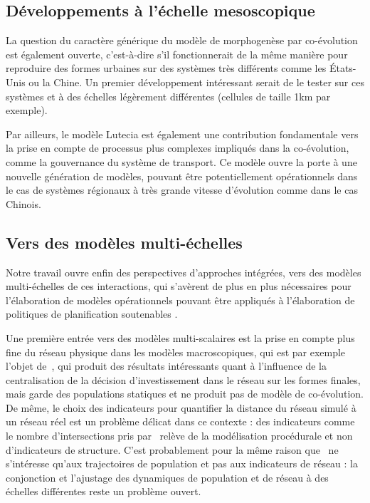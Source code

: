 \documentclass[11pt]{article}
\begin{document}
\subsection{Développements à l'échelle mesoscopique}

La question du caractère générique du modèle de morphogenèse par co-évolution est également ouverte, c'est-à-dire s'il fonctionnerait de la même manière pour reproduire des formes urbaines sur des systèmes très différents comme les États-Unis ou la Chine. Un premier développement intéressant serait de le tester sur ces systèmes et à des échelles légèrement différentes (cellules de taille 1km par exemple).

Par ailleurs, le modèle Lutecia est également une contribution fondamentale vers la prise en compte de processus plus complexes impliqués dans la co-évolution, comme la gouvernance du système de transport.
 Ce modèle ouvre la porte à une nouvelle génération de modèles, pouvant être potentiellement opérationnels dans le cas de systèmes régionaux à très grande vitesse d'évolution comme dans le cas Chinois.


\subsection{Vers des modèles multi-échelles}


Notre travail ouvre enfin des perspectives d'approches intégrées, vers des modèles multi-échelles de ces interactions, qui s'avèrent de plus en plus nécessaires pour l'élaboration de modèles opérationnels pouvant être appliqués à l'élaboration de politiques de planification soutenables \citep{rozenblat2018conclusion}.


Une première entrée vers des modèles multi-scalaires est la prise en compte plus fine du réseau physique dans les modèles macroscopiques, qui est par exemple l'objet de~\cite{mimeur:tel-01451164}, qui produit des résultats intéressants quant à l'influence de la centralisation de la décision d'investissement dans le réseau sur les formes finales, mais garde des populations statiques et ne produit pas de modèle de co-évolution. De même, le choix des indicateurs pour quantifier la distance du réseau simulé à un réseau réel est un problème délicat dans ce contexte : des indicateurs comme le nombre d'intersections pris par~\cite{mimeur:tel-01451164} relève de la modélisation procédurale et non d'indicateurs de structure. C'est probablement pour la même raison que~\cite{schmitt2014modelisation} ne s'intéresse qu'aux trajectoires de population et pas aux indicateurs de réseau : la conjonction et l'ajustage des dynamiques de population et de réseau à des échelles différentes reste un problème ouvert.
\end{document}

